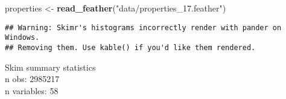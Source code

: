 \documentclass[]{book}
\newenvironment{Shaded}{\begin{snugshade}}{\end{snugshade}}
\newcommand{\KeywordTok}[1]{\textcolor[rgb]{0.13,0.29,0.53}{\textbf{#1}}}
\newcommand{\StringTok}[1]{\textcolor[rgb]{0.31,0.60,0.02}{#1}}
\newcommand{\OperatorTok}[1]{\textcolor[rgb]{0.81,0.36,0.00}{\textbf{#1}}}
\newcommand{\NormalTok}[1]{#1}
\theoremstyle{definition}
\theoremstyle{definition}
\theoremstyle{definition}
\theoremstyle{remark}
\begin{document}
\begin{Shaded}
\begin{Highlighting}[]
\NormalTok{properties <-}\StringTok{ }\KeywordTok{read_feather}\NormalTok{(}\StringTok{"data/properties_17.feather"}\NormalTok{)}
\end{Highlighting}
\end{Shaded}

\begin{Shaded}
\end{Shaded}

\begin{verbatim}
## Warning: Skimr's histograms incorrectly render with pander on Windows.
## Removing them. Use kable() if you'd like them rendered.
\end{verbatim}

Skim summary statistics\\
n obs: 2985217\\
n variables: 58
\end{document}
